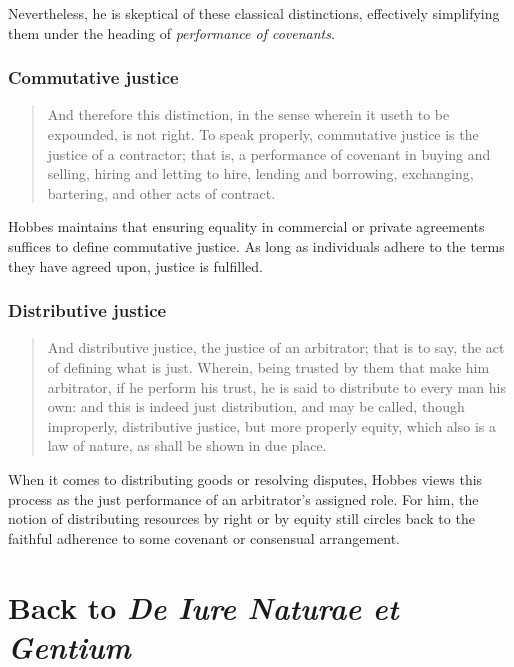             Nevertheless, he is skeptical of these classical distinctions, effectively simplifying them under the heading of \textit{performance of covenants}.

        \subsubsection{Commutative justice}

            \begin{quote}
                And therefore this distinction, in the sense wherein it useth to be expounded, is not right. To speak properly, commutative justice is the justice of a contractor; that is, a performance of covenant in buying and selling, hiring and letting to hire, lending and borrowing, exchanging, bartering, and other acts of contract.
            \end{quote}

            Hobbes maintains that ensuring equality in commercial or private agreements suffices to define commutative justice. As long as individuals adhere to the terms they have agreed upon, justice is fulfilled.

        \subsubsection{Distributive justice}

            \begin{quote}
                And distributive justice, the justice of an arbitrator; that is to say, the act of defining what is just. Wherein, being trusted by them that make him arbitrator, if he perform his trust, he is said to distribute to every man his own: and this is indeed just distribution, and may be called, though improperly, distributive justice, but more properly equity, which also is a law of nature, as shall be shown in due place.
            \end{quote}

            When it comes to distributing goods or resolving disputes, Hobbes views this process as the just performance of an arbitrator’s assigned role. For him, the notion of distributing resources by right or by equity still circles back to the faithful adherence to some covenant or consensual arrangement.

\section{Back to \textit{De Iure Naturae et Gentium}}


